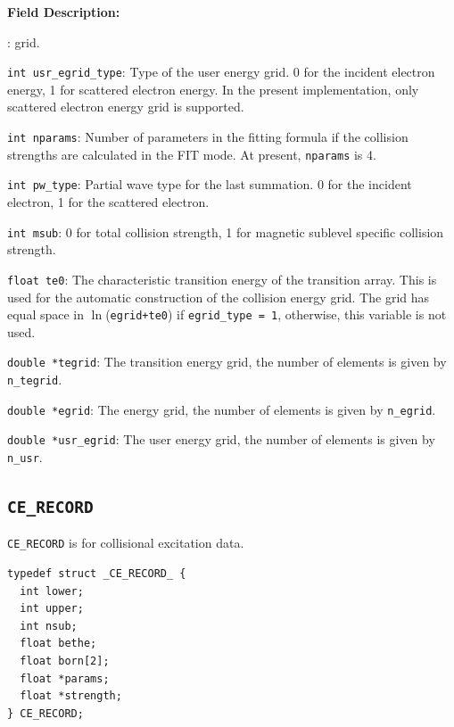 \documentclass[twoside,letterpaper]{refrep}
\newenvironment{dbdesc}{\textbf{Field Description:} \begin{list}
	{:}{\setlength{\labelwidth}{2in}
	   \setlength{\leftmargin}{2in}
	   \setlength{\labelsep}{0.1in}
	   \setlength{\rightmargin}{0.2in}}}
	{\end{list}}
\begin{document}
\begin{dbdesc}
grid.
\item[\texttt{int usr\_egrid\_type}:] Type of the user energy grid. 0 for the
incident electron energy, 1 for scattered electron energy. In the present
implementation, only scattered electron energy grid is supported.
\item[\texttt{int nparams}:] Number of parameters in the fitting formula if the
collision strengths are calculated in the FIT mode. At present,
\texttt{nparams} is 4. 
\item[\texttt{int pw\_type}:] Partial wave type for the last summation. 0 for
the incident electron, 1 for the scattered electron.
\item[\texttt{int msub}:] 0 for total collision strength, 1 for magnetic
sublevel specific collision strength.
\item[\texttt{float te0}:] The characteristic transition energy of the 
transition array. This is used for the automatic construction of the 
collision energy grid. The grid has equal space in $\ln$(\texttt{egrid+te0})
if \texttt{egrid\_type = 1}, otherwise, this variable is not used.
\item[\texttt{double *tegrid}:] The transition energy grid, the number of
elements is given by \texttt{n\_tegrid}.
\item[\texttt{double *egrid}:] The energy grid, the number of elements is
given by \texttt{n\_egrid}.
\item[\texttt{double *usr\_egrid}:] The user energy grid, the number of
elements is given by \texttt{n\_usr}.
\end{dbdesc}

\subsection{\texttt{CE\_RECORD}}
\texttt{CE\_RECORD} is for collisional excitation data.

\begin{verbatim}
typedef struct _CE_RECORD_ {
  int lower;
  int upper;
  int nsub;
  float bethe;
  float born[2];
  float *params;
  float *strength;
} CE_RECORD;
\end{verbatim}
\end{document}
